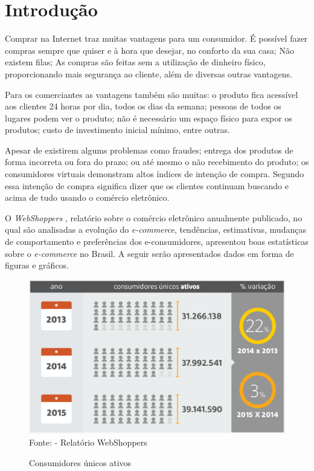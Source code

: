 \documentclass[a4paper,12pt]{monografia}
\renewcommand{\tablename}{Quadro}
\begin{document}
{%
\let\oldnumberline\numberline%
\renewcommand{\numberline}{\tablename~\oldnumberline}%
\listoftables%
\thispagestyle{empty}
}

\tableofcontents
\thispagestyle{empty}
% 
\chapter{Introdução} %
\label{cha:intro}

Comprar na Internet traz muitas vantagens para um consumidor. É possível fazer compras sempre que quiser e à hora que desejar, no conforto da sua casa; Não existem filas; As compras são feitas sem a utilização de dinheiro físico, proporcionando mais segurança ao cliente, além de diversas outras vantagens.

Para os comerciantes as vantagens também são muitas: o produto fica acessível aos clientes 24 horas por dia, todos os dias da semana; pessoas de todos os lugares podem ver o produto; não é necessário um espaço físico para expor os produtos; custo de investimento inicial mínimo, entre outras.

Apesar de existirem algums problemas como fraudes; entrega dos produtos de forma incorreta ou fora do prazo; ou até mesmo o não recebimento do produto; os consumidores virtuais demonstram altos índices de intenção de compra. Segundo  essa intenção de compra significa dizer que os clientes continuam buscando e acima de tudo usando o comércio eletrônico.

O \textit{WebShoppers} , relatório sobre o comércio eletrônico anualmente publicado, no qual são analisadas a evolução do \textit{e-commerce}, tendências, estimativas, mudanças de comportamento e preferências dos e-consumidores, apresentou boas estatísticas sobre o \textit{e-commerce} no Brasil. A seguir serão apresentados dados em forma de figuras e gráficos.

\begin{figure}[H]
\centering
\caption{Consumidores únicos ativos}
\centering
\includegraphics[width=12cm]{img/webshoppers/consumidores.eps}\\
\small{Fonte:  - Relatório WebShoppers}
\label{figura:consumidores}
\end{figure}
\end{document}
